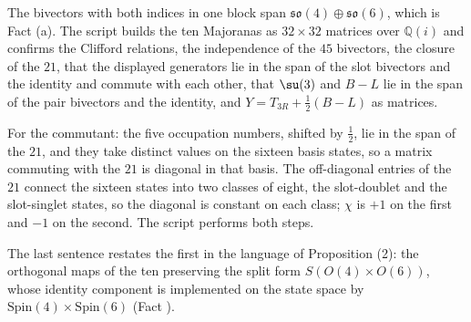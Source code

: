 The bivectors with both indices in one block span $\mathfrak{so}(4) \oplus \mathfrak{so}(6)$, which is Fact (a). The script builds the ten Majoranas as $32 \times 32$ matrices over $\mathbb{Q}(i)$ and confirms the Clifford relations, the independence of the $45$ bivectors, the closure of the $21$, that the displayed generators lie in the span of the slot bivectors and the identity and commute with each other, that $\su(3)$ and $B - L$ lie in the span of the pair bivectors and the identity, and $Y = T_{3R} + \tfrac12(B - L)$ as matrices.

For the commutant: the five occupation numbers, shifted by $\tfrac12$, lie in the span of the $21$, and they take distinct values on the sixteen basis states, so a matrix commuting with the $21$ is diagonal in that basis. The off-diagonal entries of the $21$ connect the sixteen states into two classes of eight, the slot-doublet and the slot-singlet states, so the diagonal is constant on each class; $\chi$ is $+1$ on the first and $-1$ on the second. The script performs both steps.

The last sentence restates the first in the language of Proposition (2): the orthogonal maps of the ten preserving the split form $S(O(4) \times O(6))$, whose identity component is implemented on the state space by $\mathrm{Spin}(4) \times \mathrm{Spin}(6)$ (Fact ).
